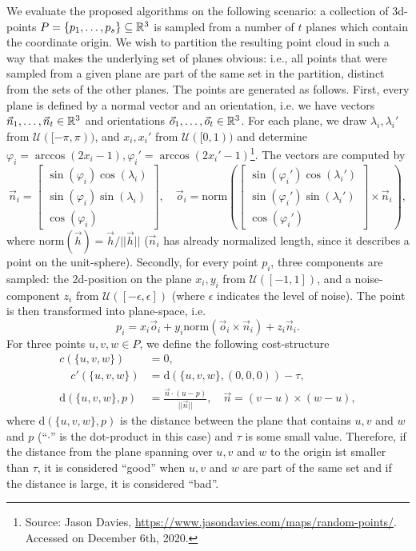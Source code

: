 We evaluate the proposed algorithms on the following scenario: a collection of 3d-points $P = \{ p_1,\dots,p_s \} \subseteq \mathbb{R}^3$ is sampled from a number of $t$ planes which contain the coordinate origin. We wish to partition the resulting point cloud in such a way that makes the underlying set of planes obvious: i.e., all points that were sampled from a given plane are part of the same set in the partition, distinct from the sets of the other planes. The points are generated as follows. First, every plane is defined by a normal vector and an orientation, i.e. we have vectors $\vec{n}_1,\dots,\vec{n}_t \in \mathbb{R}^3$ and orientations $\vec{o}_1,\dots,\vec{o}_t \in \mathbb{R}^3$. For each plane, we draw $\lambda_i,\lambda_i'$ from $\mathcal{U}([-\pi,\pi))$, and $x_i,x_i'$ from $\mathcal{U}([0,1))$ and determine $\varphi_i = \arccos(2x_i-1), \varphi_i' = \arccos(2x_i'-1)$\footnote{Source: Jason Davies, \href{https://www.jasondavies.com/maps/random-points/}{https://www.jasondavies.com/maps/random-points/}. Accessed on December 6th, 2020.}. The vectors are computed by $$ \vec{n}_i = \begin{bmatrix} \sin(\varphi_i) \cos(\lambda_i) \\ \sin(\varphi_i)\sin(\lambda_i) \\ \cos(\varphi_i) \end{bmatrix},\quad \vec{o}_i = \mathrm{norm} \left( \begin{bmatrix} \sin(\varphi_i') \cos(\lambda_i') \\ \sin(\varphi_i')\sin(\lambda_i') \\ \cos(\varphi_i') \end{bmatrix} \times \vec{n}_i \right), $$ where $\mathrm{norm}(\vec{h})=\vec{h} / ||\vec{h}||  $ ($\vec{n}_i$ has already normalized length, since it describes a point on the unit-sphere). Secondly, for every point $p_i$, three components are sampled: the 2d-position on the plane $x_i,y_i$ from $\mathcal{U}([-1,1])$, and a noise-component $z_i$ from $\mathcal{U}([-\epsilon,\epsilon])$ (where $\epsilon$ indicates the level of noise). The point is then transformed into plane-space, i.e. $$ p_i = x_i \vec{o}_i + y_i \mathrm{norm}(\vec{o}_i \times \vec{n}_i) + z_i \vec{n}_i.$$
For three points $u,v,w \in P$, we define the following cost-structure
\begin{align*}
    c(\{u,v,w\}) &= 0, \\ 
    \quad c'(\{u,v,w\}) &= \mathrm{d}(\{ u,v,w \},(0,0,0)) - \tau, \\
    \mathrm{d}(\{u,v,w\},p) &= \frac{\vec{n} \cdot (u - p)}{||\vec{n}||},\quad \vec{n} = (v-u)\times (w-u),
\end{align*}
where $\mathrm{d}(\{u,v,w\},p)$ is the distance between the plane that contains $u,v$ and $w$ and $p$ (``$\cdot$'' is the dot-product in this case) and $\tau$ is some small value. Therefore, if the distance from the plane spanning over $u,v$ and $w$ to the origin ist smaller than $\tau$, it is considered ``good'' when $u,v$ and $w$ are part of the same set and if the distance is large, it is considered ``bad''.

